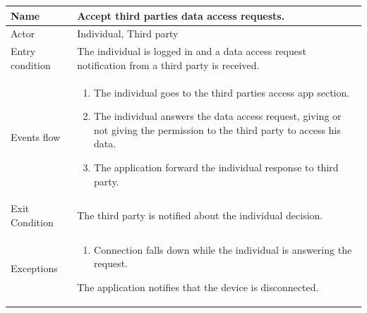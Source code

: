 \begin{table}[p]
\centering
\begin{tabular}{|l|p{11cm}|}
    \hline
    Name & Accept third parties data access requests.
    \\ \hline
    Actor & Individual, Third party
    \\ \hline 
    Entry condition & The individual is logged in and a data access request notification from a third party is received.
    \\ \hline
    Events flow &
    \begin{enumerate}
	\item The individual goes to the third parties access app section.
    \item The individual answers the data access request, giving or not giving the permission to the third party to access his data.
    \item The application forward the individual response to third party.
    \end{enumerate}
     \\ \hline
     Exit Condition & The third party is notified about the individual decision.
     \\
    \hline
    Exceptions &
        \begin{enumerate}
    \item Connection falls down while the individual is answering the request.
    \end{enumerate}
The application notifies that the device is disconnected.
      \\
    \hline
\end{tabular}
\end{table}


